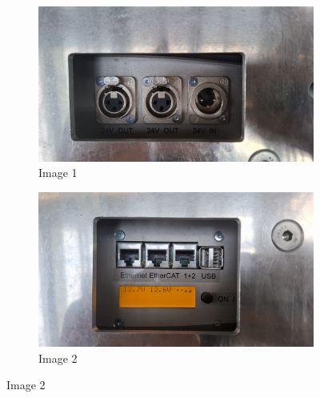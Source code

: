 \begin{figure}[ht]
        \centering

        \begin{subfigure}[b]{0.49\linewidth}
            \centering
            \includegraphics[width=\linewidth]{images/sec2/youbot_power.jpg}
            \caption{Image 1}
        \end{subfigure}
        \hfill
        \begin{subfigure}[b]{0.49\linewidth}
            \centering
            \includegraphics[width=\linewidth]{images/sec2/youbot_screen.jpg}
            \caption{Image 2}
        \end{subfigure}

        \vspace{0.5em}  %


\end{figure}
